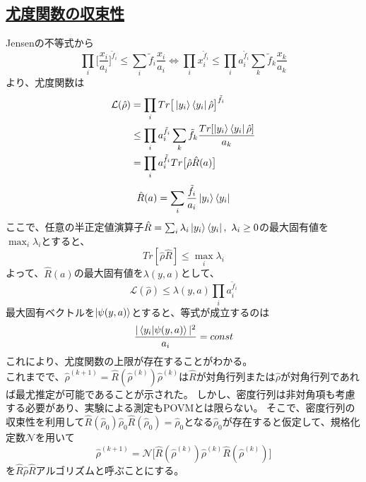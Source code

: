 \documentclass[11pt,a4j,notitlepage]{jreport}
\begin{document}
	\subsection*{\underline{尤度関数の収束性}}

	Jensenの不等式から
	\begin{equation}
		\prod_i \Big[ \frac{x_i}{a_i} \Big]^{\tilde{f}_i} \leq \sum_i \tilde{f}_i \frac{x_i}{a_i} \Longleftrightarrow \prod_i x_i^{\tilde{f}_i} \leq \prod_i a_i^{\tilde{f}_i} \sum_k \tilde{f}_k \frac{x_k}{a_k}
	\end{equation}
	より、尤度関数は
	\begin{equation}
		\begin{aligned}
			\mathcal{L} (\hat{\rho}) &= \prod_i Tr \big[ \ket{y_i} \bra{y_i} \hat{\rho} \big]^{\tilde{f}_i} \\
			&\leq \prod_i a_i^{\tilde{f}_i} \sum_k \tilde{f}_k \frac{Tr [ \ket{y_i} \bra{y_i} \hat{\rho}]}{a_k} \\
			&= \prod_i a_i^{\tilde{f}_i} Tr \big[ \hat{\rho} \hat{R} (a) \big]
		\end{aligned}
	\end{equation}
	\begin{equation}
		\hat{R} (a) = \sum_i \frac{\tilde{f}_i}{a_i} \ket{y_i} \bra{y_i}
	\end{equation}
	ここで、任意の半正定値演算子$\hat{R} = \sum_i \lambda_i \ket{y_i} \bra{y_i},\ \lambda_i \geq 0$の最大固有値を$\max_i \lambda_i$とすると、
	\begin{equation}
		Tr [\hat{\rho} \hat{R}] \leq \max_i \lambda_i
	\end{equation}
	よって、$\hat{R} (a)$の最大固有値を$\lambda (y, a)$として、
	\begin{equation}
		\mathcal{L} (\hat{\rho}) \leq \lambda (y, a) \prod_i a_i^{\tilde{f}_i}
	\end{equation}
	最大固有ベクトルを$\ket{\psi(y, a)}$とすると、等式が成立するのは
	\begin{equation}
		\frac{| \braket{y_i | \psi (y, a)} |^2}{a_i} = const
	\end{equation}
	これにより、尤度関数の上限が存在することがわかる。\\

	これまでで、$\hat{\rho}^{(k+1)} = \hat{R} (\hat{\rho}^{(k)}) \hat{\rho}^{(k)}$は$\hat{R}$が対角行列または$\hat{\rho}$が対角行列であれば最尤推定が可能であることが示された。
	しかし、密度行列は非対角項も考慮する必要があり、実験による測定もPOVMとは限らない。
	そこで、密度行列の収束性を利用して$\hat{R} (\hat{\rho}_0) \hat{\rho}_0 \hat{R} (\hat{\rho}_0) = \hat{\rho}_0$となる$\hat{\rho}_0$が存在すると仮定して、規格化定数$\mathcal{N}$を用いて
	\begin{equation}
		\hat{\rho}^{(k+1)} = \mathcal{N} \big[ \hat{R} (\hat{\rho}^{(k)}) \hat{\rho}^{(k)} \hat{R} (\hat{\rho}^{(k)}) \big]
	\end{equation}
	を$\hat{R} \hat{\rho} \hat{R}$アルゴリズムと呼ぶことにする。
\end{document}
